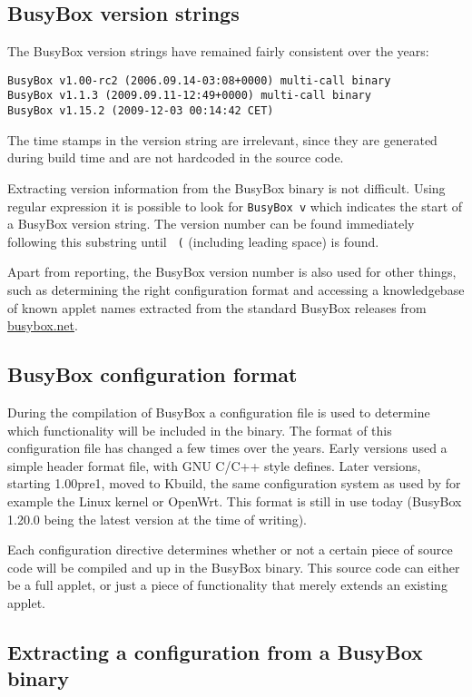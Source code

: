 \documentclass[10pt,a4paper]{article}
\begin{document}
\subsection{BusyBox version strings}

The BusyBox version strings have remained fairly consistent over the years:

\begin{verbatim}
BusyBox v1.00-rc2 (2006.09.14-03:08+0000) multi-call binary
BusyBox v1.1.3 (2009.09.11-12:49+0000) multi-call binary
BusyBox v1.15.2 (2009-12-03 00:14:42 CET)
\end{verbatim}

The time stamps in the version string are irrelevant, since they are generated
during build time and are not hardcoded in the source code.

Extracting version information from the BusyBox binary is not difficult.
Using regular expression it is possible to look for \texttt{BusyBox v} which
indicates the start of a BusyBox version string. The version number can be
found immediately following this substring until \texttt{ (} (including
leading space) is found.

Apart from reporting, the BusyBox version number is also used for other
things, such as determining the right configuration format and accessing a
knowledgebase of known applet names extracted from the standard BusyBox
releases from \url{busybox.net}.

\subsection{BusyBox configuration format}

During the compilation of BusyBox a configuration file is used to determine
which functionality will be included in the binary. The format of this
configuration file has changed a few times over the years. Early versions used
a simple header format file, with GNU C/C++ style defines. Later versions,
starting 1.00pre1, moved to Kbuild, the same configuration system as used by
for example the Linux kernel or OpenWrt. This format is still in use today
(BusyBox 1.20.0 being the latest version at the time of writing).

Each configuration directive determines whether or not a certain piece of
source code will be compiled and up in the BusyBox binary. This source code can
either be a full applet, or just a piece of functionality that merely extends
an existing applet.

\subsection{Extracting a configuration from a BusyBox binary}
\end{document}
